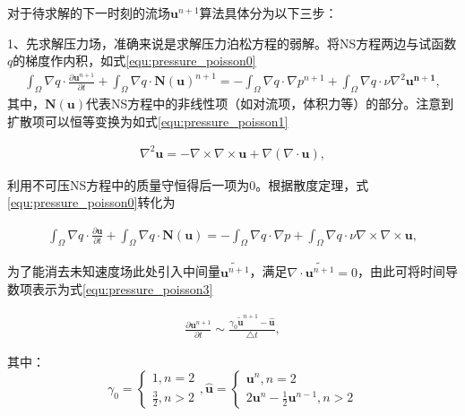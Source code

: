 对于待求解的下一时刻的流场$\bm u^{n+1}$算法具体分为以下三步：

1、先求解压力场，准确来说是求解压力泊松方程的弱解。将NS方程两边与试函数$q$的梯度作内积，如式\ref{equ:pressure_poisson0}
\begin{equation}
    \begin{aligned}
\int_{\Omega}\nabla q\cdot \frac{\partial \bm u^{n+1}}{\partial t} + \int_{\Omega}\nabla q\cdot \bm N{(\bm u)}^{n+1} = -\int_{\Omega}\nabla q\cdot \nabla p^{n+1} + \int_{\Omega}\nabla q\cdot \nu \nabla^2 \boldsymbol{u^{n+1}},
\end{aligned}
\label{equ:pressure_poisson0}
\end{equation}
其中，$\bm N(\bm u)$代表NS方程中的非线性项（如对流项，体积力等）的部分。注意到扩散项可以恒等变换为如式\ref{equ:pressure_poisson1}

\begin{equation}
    \begin{aligned}
\nabla^2 \bm u = -\nabla \times \nabla \times \bm u + \nabla(\nabla \cdot \bm u),
\end{aligned}
\label{equ:pressure_poisson1}
\end{equation}

利用不可压NS方程中的质量守恒得后一项为0。根据散度定理，式\ref{equ:pressure_poisson0}转化为

\begin{equation}
    \begin{aligned}
\int_{\Omega}\nabla q\cdot \frac{\partial \bm u}{\partial t} + \int_{\Omega}\nabla q\cdot \bm N(\bm u) = -\int_{\Omega}\nabla q\cdot \nabla p + \int_{\Omega}\nabla q\cdot \nu \nabla \times \nabla \times \boldsymbol{u},
\end{aligned}
\label{equ:pressure_poisson2}
\end{equation}

为了能消去未知速度场此处引入中间量$\tilde{\bm u^{n+1}}$，满足$\nabla \cdot \tilde{\bm u^{n+1}}=0$，由此可将时间导数项表示为式\ref{equ:pressure_poisson3}

\begin{equation}
    \begin{aligned}
\frac{\partial \bm u^{n+1}}{\partial t} \sim \frac{\gamma_0 \tilde{\bm u}^{n+1} - \hat{\bm u}}{\triangle t},
\end{aligned}
\label{equ:pressure_poisson3}
\end{equation}

其中：
\begin{equation}
\gamma_0 = \left\{
    \begin{aligned}
    1, n = 2\\
    \frac{3}{2},  n > 2
\end{aligned}
\right.,
\hat{\bm u} = 
\left\{
\begin{aligned}
\bm u^{n}, n = 2\\
2\bm u^{n} - \frac{1}{2}\bm u^{n-1}, n > 2 
\end{aligned}
\right.
\label{equ:time_gradient}
\end{equation}

